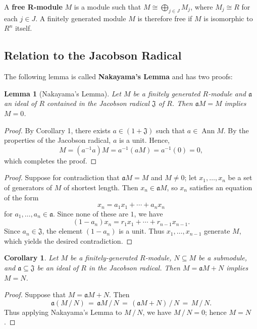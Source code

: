 \documentclass[11pt]{article}
\newtheorem{lemma}{Lemma}
\newtheorem{corollary}{Corollary}
\newcommand{\Ann}{\operatorname{Ann}}
\begin{document}
A \textbf{free R-module} $M$ is a module such that $M \cong \bigoplus_{j \in J} M_{j}$, where $M_{j} \cong R$ for each $j \in J$. A finitely generated module $M$ is therefore free if $M$ is isomorphic to $R^{n}$ itself.

\subsection{Relation to the Jacobson Radical}


The following lemma is called \textbf{Nakayama's Lemma} and has two proofs:

\begin{adjustwidth}{0.5cm}{}
	\begin{lemma}[Nakayama's Lemma]
		Let $M$ be a finitely generated $R$-module and $\mathfrak{a}$ an ideal of $R$ contained in the Jacobson radical $\mathfrak{J}$ of $R$. Then $\mathfrak{a}M = M$ implies $M = 0$.
	\end{lemma}
	\begin{proof}
		By Corollary 1, there exists $a \in (1 + \mathfrak{J})$ such that $a \in \Ann M$. By the properties of the Jacobson radical, $a$ is a unit. Hence,
		\[
			M = (a^{-1}a)M = a^{-1}(aM) = a^{-1}(0) = 0,
		\]
    which completes the proof.
	\end{proof}
	\begin{proof}
		Suppose for contradiction that $\mathfrak{a}M = M$ and $M \ne 0$; let $x_{1}, \ldots, x_{n}$ be a set of generators of $M$ of shortest length. Then $x_{n} \in \mathfrak{a}M$, so $x_{n}$ satisfies an equation of the form
		\[
			 x_{n} = a_{1} x_{1} + \cdots + a_{n} x_{n}
		\]
		for $a_{1}, \ldots, a_{n} \in \mathfrak{a}$. Since none of these are $1$, we have
		\[
			(1 - a_{n})x_{n} = r_{1}x_{1} + \cdots + r_{n - 1}x_{n - 1}.
		\]
    Since $a_{n} \in \mathfrak{J}$, the element $(1 - a_{n})$ is a unit. Thus $x_{1}, \ldots, x_{n - 1}$ generate $M$, which yields the desired contradiction.
	\end{proof}
\end{adjustwidth}

\begin{adjustwidth}{0.5cm}{}
	\begin{corollary}
		Let $M$ be a finitely-generated $R$-module, $N \subseteq M$ be a submodule, and $\mathfrak{a} \subseteq \mathfrak{J}$ be an ideal of $R$ in the Jacobson radical. Then $M = \mathfrak{a}M + N$ implies $M = N$.
	\end{corollary}
	\begin{proof}
    Suppose that $M = \mathfrak{a}M + N$. Then
    \[
      \mathfrak{a}(M \, / \, N) \, = \, \mathfrak{a}M \, / \, N \, = \, (\mathfrak{a}M + N) \, / \, N \, = \, M \, / \, N.
    \]
    Thus applying Nakayama's Lemma to $M \, / \, N$, we have $M \, / \, N = 0$; hence $M = N$.
	\end{proof}
\end{adjustwidth}
\end{document}
